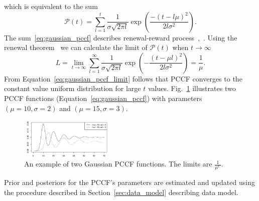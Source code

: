 %
%
which is equivalent to the sum
\begin{equation}
    \mathcal{P}(t) = \sum_{l=1}^{t} \frac{1}{\sigma \sqrt{2 \pi l}} \exp \left(\frac{-(t - l \mu)^2}{2 l \sigma^2} \right)
    \label{eq:gaussian_pccf}.
\end{equation}
The sum~\ref{eq:gaussian_pccf} describes renewal-reward process~\cite{cox1962renewal},~\cite{feller1968introduction}.
Using the renewal theorem~\cite{cox1962renewal}
we can calculate the limit of $\mathcal{P}(t)$ when $t \to \infty$
\begin{equation}
L = \lim_{t \to \infty} \sum_{l=1}^{\infty} \frac{1}{\sigma \sqrt{2 \pi l}} \exp\left(-\frac{(t- \mu l)^2}{2 l \sigma^2} \right) = \frac{1}{\mu}.
\label{eq:gaussian_pccf_limit}
\end{equation}
From Equation~\ref{eq:gaussian_pccf_limit} follows that PCCF converges to the constant value uniform distribution for large $t$ values.
Fig.~\ref{fig:pccf_example} illustrates two PCCF
functions (Equation~\ref{eq:gaussian_pccf}) with parameters $(\mu=10, \sigma=2)$ and $(\mu=15, \sigma=3)$.
\begin{figure}[htb!]
    \centering
    \includegraphics[width=0.40\textwidth]{images/blpa_article/pccfExamples.pdf}
    \caption{
        An example of two Gaussian PCCF functions.
        The limits are $\frac{1}{\mu^C}.$
    }
    \label{fig:pccf_example}
\end{figure}
Prior and posteriors for the PCCF's parameters are estimated and updated using the procedure described in Section~\ref{sec:data_model} describing data model.

